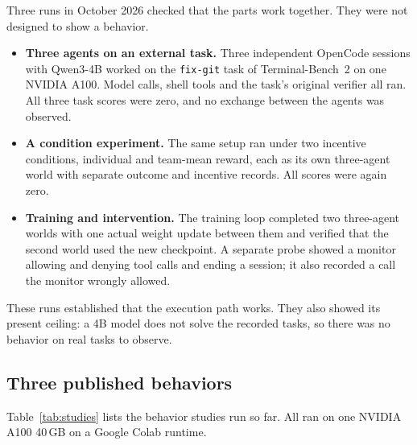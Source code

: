 \documentclass[11pt,a4paper]{article}
\begin{document}
Three runs in October 2026 checked that the parts work together. They were not designed to show a behavior.

\begin{itemize}
\item \textbf{Three agents on an external task.} Three independent OpenCode sessions with Qwen3-4B worked
  on the \texttt{fix-git} task of Terminal-Bench~2 on one NVIDIA A100. Model calls, shell tools and the
  task's original verifier all ran. All three task scores were zero, and no exchange between the agents was
  observed.
\item \textbf{A condition experiment.} The same setup ran under two incentive conditions, individual and
  team-mean reward, each as its own three-agent world with separate outcome and incentive records. All
  scores were again zero.
\item \textbf{Training and intervention.} The training loop completed two three-agent worlds with one
  actual weight update between them and verified that the second world used the new checkpoint. A separate
  probe showed a monitor allowing and denying tool calls and ending a session; it also recorded a call the
  monitor wrongly allowed.
\end{itemize}

These runs established that the execution path works. They also showed its present ceiling: a 4B model
does not solve the recorded tasks, so there was no behavior on real tasks to observe.

\subsection{Three published behaviors}

Table~\ref{tab:studies} lists the behavior studies run so far. All ran on one NVIDIA A100 40\,GB on a
Google Colab runtime.
\end{document}
